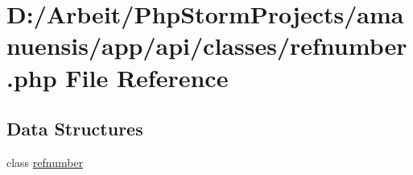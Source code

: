 \hypertarget{a00072}{}\section{D\+:/\+Arbeit/\+Php\+Storm\+Projects/amanuensis/app/api/classes/refnumber.php File Reference}
\label{a00072}
\subsection*{Data Structures}
\begin{DoxyCompactItemize}
\item 
class \hyperlink{a00038}{refnumber}
\end{DoxyCompactItemize}
